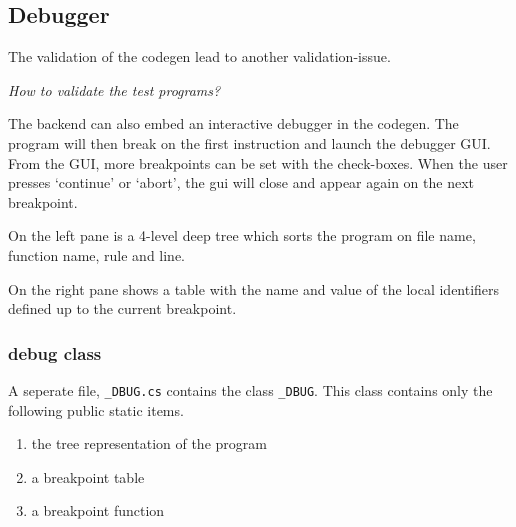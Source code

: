 \subsection{Debugger}\label{debugger}
The validation of the codegen lead to another validation-issue.

\textit{How to validate the test programs?}


The backend can also embed an interactive debugger in the codegen.
The program will then break on the first instruction and launch the debugger GUI.
From the GUI, more breakpoints can be set with the check-boxes.
When the user presses `continue' or `abort', the gui will close and appear again on the next breakpoint.

On the left pane is a 4-level deep tree which sorts the program on file name, function name, rule and line.

On the right pane shows a table with the name and value of the local identifiers defined up to the current breakpoint.

\subsubsection{debug class}

A seperate file, \verb|_DBUG.cs| contains the class \verb|_DBUG|.
This class contains only the following public static items.

\begin{enumerate}
    \item the tree representation of the program
    \item a breakpoint table
    \item a breakpoint function
\end{enumerate}

